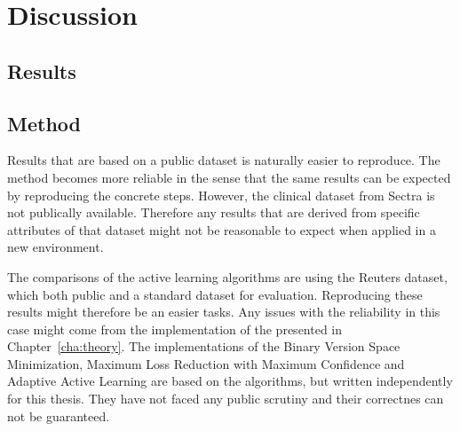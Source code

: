 \chapter{Discussion}
\label{cha:discussion}


\section{Results}
\label{sec:discussion-results}


\section{Method}
\label{sec:discussion-method}

Results that are based on a public dataset is naturally easier to reproduce.
The method becomes more reliable in the sense that the same results can be expected by reproducing the concrete steps.
However, the clinical dataset from Sectra is not publically available.
Therefore any results that are derived from specific attributes of that dataset might not be reasonable to expect when applied in a new environment.

The comparisons of the active learning algorithms are using the Reuters dataset, which both public and a standard dataset for evaluation.
Reproducing these results might therefore be an easier tasks.
Any issues with the reliability in this case might come from the implementation of the presented in Chapter~\ref{cha:theory}.
The implementations of the Binary Version Space Minimization, Maximum Loss Reduction with Maximum Confidence and Adaptive Active Learning are based on the algorithms, but written independently for this thesis.
They have not faced any public scrutiny and their correctnes can not be guaranteed.

